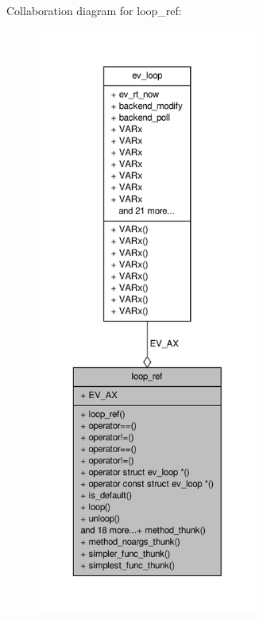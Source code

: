 \-Collaboration diagram for loop\-\_\-ref\-:
\nopagebreak
\begin{figure}[H]
\begin{center}
\leavevmode
\includegraphics[height=550pt]{structev_1_1loop__ref__coll__graph}
\end{center}
\end{figure}
